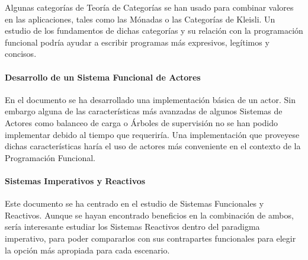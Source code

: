 \documentclass[../main.tex]{subfiles}
\begin{document}
Algunas categorías de Teoría de Categorías se han usado para combinar valores
en las aplicaciones, tales como las Mónadas o las Categorías de Kleisli. Un estudio
de los fundamentos de dichas categorías y su relación con la programación funcional
podría ayudar a escribir programas más expresivos, legítimos y concisos.

\paragraph{Desarrollo de un Sistema Funcional de Actores}

En el documento se ha desarrollado una implementación básica de un actor. Sin embargo
alguna de las características más avanzadas de algunos Sistemas de Actores como balanceo
de carga o Árboles de supervisión no se han podido implementar debido al tiempo que
requeriría. Una implementación que proveyese dichas características haría el uso de actores
más conveniente en el contexto de la Programación Funcional.

\paragraph{Sistemas Imperativos y Reactivos}
Este documento se ha centrado en el estudio de Sistemas Funcionales y Reactivos.
Aunque se hayan encontrado beneficios en la combinación de ambos, sería interesante
estudiar los Sistemas Reactivos dentro del paradigma imperativo, para poder compararlos con
sus contrapartes funcionales para elegir la opción más apropiada para cada escenario.
\end{document}
